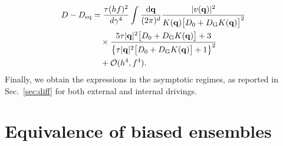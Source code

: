 \documentclass[superscriptaddress, twocolumn, prx, longbibliography, nofootinbib]{revtex4-1}
\begin{document}
\begin{equation}
	\begin{aligned}
		D - D_{\rm eq} &= \frac{\tau(hf)^2}{d\gamma^4} \int \frac{{\rm d}{\bf q}}{(2\pi)^d} \frac{|v({\bf q})|^2}{K({\bf q})\big[D_0+D_{\rm G}K({\bf q})\big]^2}
		\\
		&\quad\times \frac{5\tau|{\bf q}|^2\big[D_0+D_{\rm G}K({\bf q})\big] + 3}{ \big\{ \tau|{\bf q}|^2\big[D_0+D_{\rm G}K({\bf q})\big] + 1 \big\}^2}
		\\
		&\quad + {\cal O}(h^4,f^4) .
	\end{aligned}
\end{equation}
Finally, we obtain the expressions in the asymptotic regimes, as reported in Sec.~\ref{sec:diff} for both external and internal drivings.




\section{Equivalence of biased ensembles}\label{app:far}
\end{document}
